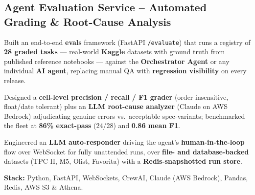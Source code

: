 \documentclass[letter,10pt]{article}
\begin{document}
\subsection{Agent Evaluation Service -- Automated Grading \& Root-Cause Analysis}
\begin{zitemize}
\item Built an end-to-end \textbf{evals} framework (FastAPI \texttt{/evaluate}) that runs a registry of \textbf{28 graded tasks} --- real-world \textbf{Kaggle} datasets with ground truth from published reference notebooks --- against the \textbf{Orchestrator Agent} or any individual \textbf{AI agent}, replacing manual QA with \textbf{regression visibility} on every release.
\item Designed a \textbf{cell-level precision / recall / F1 grader} (order-insensitive, float/date tolerant) plus an \textbf{LLM root-cause analyzer} (Claude on AWS Bedrock) adjudicating genuine errors vs.\ acceptable spec-variants; benchmarked the fleet at \textbf{86\% exact-pass} (24/28) and \textbf{0.86 mean F1}.
\item Engineered an \textbf{LLM auto-responder} driving the agent's \textbf{human-in-the-loop} flow over WebSocket for fully unattended runs, over \textbf{file- and database-backed} datasets (TPC-H, M5, Olist, Favorita) with a \textbf{Redis-snapshotted run store}.
\item \textbf{Stack:} Python, FastAPI, WebSockets, CrewAI, Claude (AWS Bedrock), Pandas, Redis, AWS S3 \& Athena.
\end{zitemize}

\end{document}
